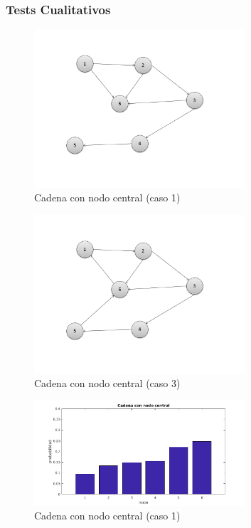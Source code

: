 \subsubsection*{Tests Cualitativos}



\begin{figure}[H]
  \centering
    \includegraphics[width=0.7\textwidth]{img/Cadena6v1.png}
  \caption{Cadena con nodo central (caso 1)}
  \label{fig: Cadena con nodo central (caso 1)}
\end{figure}


\begin{figure}[H]
  \centering
    \includegraphics[width=0.7\textwidth]{img/Cadena6v3.png}
  \caption{Cadena con nodo central (caso 3)}
  \label{fig: Cadena con nodo central, con ciclo}
\end{figure}


\begin{figure}[H]
  \centering
    \includegraphics[width=0.7\textwidth]{img/cadena6v1.png}
  \caption{Cadena con nodo central (caso 1)}
  \label{fig: Cadena con nodo central (caso 1)}
\end{figure}


